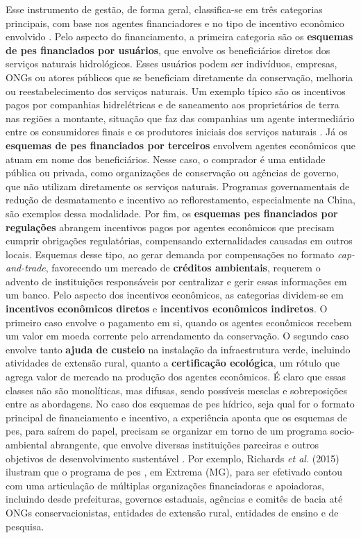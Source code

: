 \documentclass[./main.tex]{subfiles}
\begin{document}
\par Esse instrumento de gestão, de forma geral, classifica-se em três categorias principais, com base nos agentes financiadores e no tipo de incentivo econômico envolvido \cite{Smith2006a, Salzman2018a}. Pelo aspecto do financiamento, a primeira categoria são os \textbf{esquemas de \acrshort{pes} financiados por usuários}, que envolve os beneficiários diretos dos serviços naturais hidrológicos. Esses usuários podem ser indivíduos, empresas, ONGs ou atores públicos que se beneficiam diretamente da conservação, melhoria ou reestabelecimento dos serviços naturais. Um exemplo típico são os incentivos pagos por companhias hidrelétricas e de saneamento aos proprietários de terra nas regiões a montante, situação que faz das companhias um agente intermediário entre os consumidores finais e os produtores iniciais dos serviços naturais \cite{Fuentes-Llanillo2021}. Já os \textbf{esquemas de \acrshort{pes} financiados por terceiros} envolvem agentes econômicos que atuam em nome dos beneficiários. Nesse caso, o comprador é uma entidade pública ou privada, como organizações de conservação ou agências de governo, que não utilizam diretamente os serviços naturais. Programas governamentais de redução de desmatamento e incentivo ao reflorestamento, especialmente na China, são exemplos dessa modalidade. Por fim, os \textbf{esquemas \acrshort{pes} financiados por regulações} abrangem incentivos pagos por agentes econômicos que precisam cumprir obrigações regulatórias, compensando externalidades causadas em outros locais. Esquemas desse tipo, ao gerar demanda por compensações no formato \textit{cap-and-trade}, favorecendo um mercado de \textbf{créditos ambientais}, requerem o advento de instituições responsáveis por centralizar e gerir essas informações em um banco. Pelo aspecto dos incentivos econômicos, as categorias dividem-se em \textbf{incentivos econômicos diretos} e \textbf{incentivos econômicos indiretos}. O primeiro caso envolve o pagamento em si, quando os agentes econômicos recebem um valor em moeda corrente pelo arrendamento da conservação. O segundo caso envolve tanto \textbf{ajuda de custeio} na instalação da infraestrutura verde, incluindo atividades de extensão rural, quanto a \textbf{certificação ecológica}, um rótulo que agrega valor de mercado na produção dos agentes econômicos. É claro que essas classes não são monolíticas, mas difusas, sendo possíveis mesclas e sobreposições entre as abordagens. No caso dos esquemas de \acrshort{pes} hídrico, seja qual for o formato principal de financiamento e incentivo, a experiência aponta que os esquemas de \acrshort{pes}, para saírem do papel, precisam se organizar em torno de um programa socio-ambiental abrangente, que envolve diversas instituições parceiras e outros objetivos de desenvolvimento sustentável \cite{Viani2019a}. Por exemplo, Richards \textit{et al.} (2015) \cite{Richards1931a} ilustram que o programa de \acrshort{pes} , em Extrema (MG), para ser efetivado contou com uma articulação de múltiplas organizações financiadoras e apoiadoras, incluindo desde prefeituras, governos estaduais, agências e comitês de bacia até ONGs conservacionistas, entidades de extensão rural, entidades de ensino e de pesquisa.   
\end{document}
